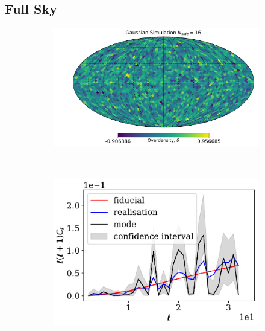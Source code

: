 \subsection{Full Sky}
\begin{figure}
\begin{center}
\begin{subfigure}[b]{.5\textwidth}
 \includegraphics[scale=0.35]{BPL-FIGS/GenData-FullSky-N16_map.pdf}   
  \caption{}
  \label{fig:BPL:GaussFSMAP}
\end{subfigure}\\
\end{center}
\begin{subfigure}{.5\textwidth}
  \centering
  \includegraphics[scale=0.50]{BPL-FIGS/GenData-FullSky-N16clsHPD.pdf}
  \caption{}
\end{subfigure}
\begin{subfigure}{.5\textwidth}
  \centering

\end{subfigure}
\end{figure}

